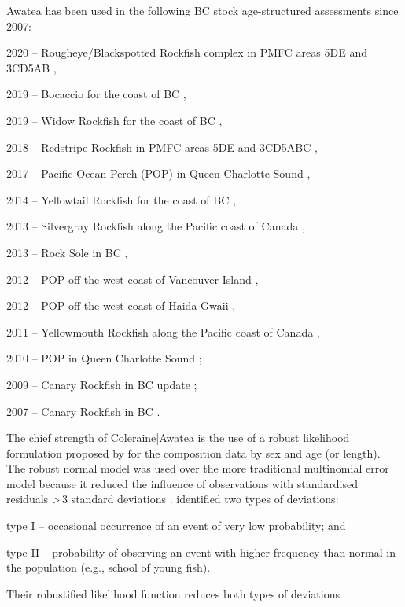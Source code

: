 \documentclass[11pt]{book}
\begin{document}
Awatea has been used in the following BC stock age-structured assessments since 2007:
\begin{itemize_csas}{}{}
\item 2020 -- Rougheye/Blackspotted Rockfish complex in PMFC areas 5DE and 3CD5AB \citep{Starr-Haigh:2022_rebs},
\item 2019 -- Bocaccio for the coast of BC \citep{Starr-Haigh:2022_bor},
\item 2019 -- Widow Rockfish for the coast of BC \citep{Starr-Haigh:2021_wwr},
\item 2018 -- Redstripe Rockfish in PMFC areas 5DE and 3CD5ABC \citep{Starr-Haigh:2021_rsr},
\item 2017 -- Pacific Ocean Perch (POP) in Queen Charlotte Sound \citep{Haigh-etal:2018_pop5ABC},
\item 2014 -- Yellowtail Rockfish for the coast of BC \citep{DFO-SAR:2015_ytr},
\item 2013 -- Silvergray Rockfish along the Pacific coast of Canada \citep{Starr-etal:2016_sgr},
\item 2013 -- Rock Sole in BC \citep{Holt-etal:2016_rol},
\item 2012 -- POP off the west coast of Vancouver Island \citep{Edwards-etal:2014_pop3CD},
\item 2012 -- POP off the west coast of Haida Gwaii \citep{Edwards-etal:2014_pop5DE},
\item 2011 -- Yellowmouth Rockfish along the Pacific coast of Canada \citep{Edwards-etal:2012_ymr},
\item 2010 -- POP in Queen Charlotte Sound \citep{Edwards-etal:2012_pop5ABC};
\item 2009 -- Canary Rockfish in BC update \citep{DFO-SR:2009_car};
\item 2007 -- Canary Rockfish in BC \citep{Stanley-etal:2009_car}.
\end{itemize_csas}

The chief strength of Coleraine|Awatea is the use of a robust likelihood formulation proposed by \citet{Fournier-etal:1998} for the composition data by sex and age (or length).
The robust normal model was used over the more traditional multinomial error model because it reduced the influence of observations with standardised residuals >\,3 standard deviations \citep{Fournier-etal:1990}.
\citet{Fournier-etal:1990} identified two types of deviations:
\begin{itemize_csas}{}{}
	\item type I -- occasional occurrence of an event of very low probability; and
	\item type II -- probability of observing an event with higher frequency than normal in the population (e.g., school of young fish).
\end{itemize_csas}
Their robustified likelihood function reduces both types of deviations.
\end{document}

